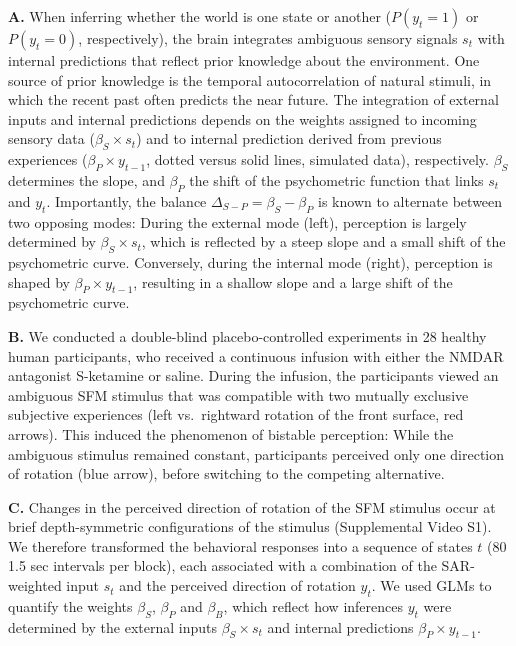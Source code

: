 \documentclass[
]{article}
\begin{document}
\textbf{A.} When inferring whether the world is one state or another
(\(P(y_t = 1)\) or \(P(y_t = 0)\), respectively), the brain integrates
ambiguous sensory signals \(s_t\) with internal predictions that reflect
prior knowledge about the environment. One source of prior knowledge is
the temporal autocorrelation of natural stimuli, in which the recent
past often predicts the near future. The integration of external inputs
and internal predictions depends on the weights assigned to incoming
sensory data (\(\beta_S \times s_t\)) and to internal prediction derived
from previous experiences (\(\beta_P \times y_{t-1}\), dotted versus
solid lines, simulated data), respectively. \(\beta_S\) determines the
slope, and \(\beta_P\) the shift of the psychometric function that links
\(s_t\) and \(y_t\). Importantly, the balance
\(\Delta_{S-P} = \beta_S - \beta_P\) is known to alternate between two
opposing modes: During the external mode (left), perception is largely
determined by \(\beta_S \times s_t\), which is reflected by a steep
slope and a small shift of the psychometric curve. Conversely, during
the internal mode (right), perception is shaped by
\(\beta_P \times y_{t-1}\), resulting in a shallow slope and a large
shift of the psychometric curve.

\textbf{B.} We conducted a double-blind placebo-controlled experiments
in 28 healthy human participants, who received a continuous infusion
with either the NMDAR antagonist S-ketamine or saline. During the
infusion, the participants viewed an ambiguous SFM stimulus that was
compatible with two mutually exclusive subjective experiences (left
vs.~rightward rotation of the front surface, red arrows). This induced
the phenomenon of bistable perception: While the ambiguous stimulus
remained constant, participants perceived only one direction of rotation
(blue arrow), before switching to the competing alternative.

\textbf{C.} Changes in the perceived direction of rotation of the SFM
stimulus occur at brief depth-symmetric configurations of the stimulus
(Supplemental Video S1). We therefore transformed the behavioral
responses into a sequence of states \(t\) (80 1.5 sec intervals per
block), each associated with a combination of the SAR-weighted input
\(s_t\) and the perceived direction of rotation \(y_t\). We used GLMs to
quantify the weights \(\beta_S\), \(\beta_P\) and \(\beta_B\), which
reflect how inferences \(y_t\) were determined by the external inputs
\(\beta_S \times s_t\) and internal predictions
\(\beta_P \times y_{t-1}\).
\end{document}
